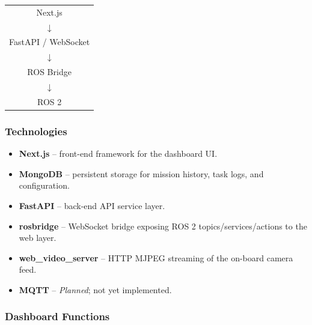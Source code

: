 \documentclass[a4paper, 12pt]{article}
\begin{document}
\begin{stagebox}
\begin{center}
\begin{tabular}{c}
Next.js \\
$\downarrow$ \\
FastAPI / WebSocket \\
$\downarrow$ \\
ROS Bridge \\
$\downarrow$ \\
ROS 2
\end{tabular}
\end{center}
\end{stagebox}

\subsubsection*{Technologies}

\begin{itemize}
    \item \textbf{Next.js} -- front-end framework for the dashboard UI.
    \item \textbf{MongoDB} -- persistent storage for mission history,
    task logs, and configuration.
    \item \textbf{FastAPI} -- back-end API service layer.
    \item \textbf{rosbridge} -- WebSocket bridge exposing ROS 2
    topics/services/actions to the web layer.
    \item \textbf{web\_video\_server} -- HTTP MJPEG streaming of the
    on-board camera feed.
    \item \textbf{MQTT} -- \emph{Planned}; not yet implemented.
\end{itemize}

\subsubsection*{Dashboard Functions}
\end{document}
